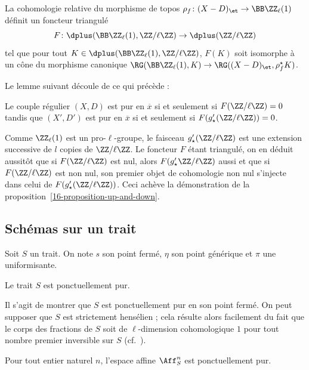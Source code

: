 \documentclass[10pt]{../fichiers-configuration-latex/smfart}
\begin{document}
La cohomologie relative du morphisme de topos $\rho_f\colon (X-D)_\et\to
\BB\ZZ_\ell(1)$ définit un foncteur triangulé 
\[F\colon \dplus(\BB\ZZ_\ell(1),\ZZ/\ell\ZZ)\to
\dplus(\ZZ/\ell\ZZ)\]
tel que pour tout $K\in\dplus(\BB\ZZ_\ell(1),\ZZ/\ell\ZZ)$, $F(K)$ soit
isomorphe à un cône du morphisme canonique $\RG(\BB\ZZ_\ell(1),K)\to
\RG((X-D)_\et,\rho_f^\star K)$.

Le lemme suivant découle de ce qui précède :

\begin{lemme2}
Le couple régulier $(X,D)$ est pur en $\overline x$
si et seulement si $F(\ZZ/\ell\ZZ)=0$
tandis que $(X',D')$ est pur en $\overline x$
si et seulement si $F(g'_\star(\ZZ/\ell\ZZ))=0$.
\end{lemme2}

Comme $\ZZ_\ell(1)$ est un pro-$\ell$-groupe, le faisceau
$g'_\star(\ZZ/\ell\ZZ)$ est une extension successive de $l$ copies de
$\ZZ/\ell\ZZ$. Le foncteur $F$ étant triangulé, on en déduit aussitôt que
si $F(\ZZ/\ell\ZZ)$ est nul, alors $F(g'_\star\ZZ/\ell\ZZ)$ aussi et que si
$F(\ZZ/\ell\ZZ)$ est non nul, son premier objet de cohomologie non nul
s'injecte dans celui de $F(g'_\star(\ZZ/\ell\ZZ))$. Ceci achève la
démonstration de la proposition~\ref{16-proposition-up-and-down}.

\subsection{Schémas sur un trait}%
\label{16-subsection-schemas-sur-un-trait}

Soit $S$ un trait. On note $s$ son point fermé, $\eta$ son point
générique et $\pi$ une uniformisante.

\begin{proposition2}\label{16-proposition-un-trait-est-ponctuellement-pur}
Le trait $S$ est ponctuellement pur.
\end{proposition2}

Il s'agit de montrer que $S$ est ponctuellement pur en son point fermé.
On peut supposer que $S$ est strictement hensélien ; cela résulte alors
facilement du fait que le corps des fractions de $S$ soit de $\ell$-dimension
cohomologique $1$ pour tout nombre premier inversible sur $S$
(cf.~).

\begin{proposition2}
Pour tout entier naturel $n$, l'espace affine $\Aff^n_S$ est ponctuellement
pur.
\end{proposition2}
\end{document}

